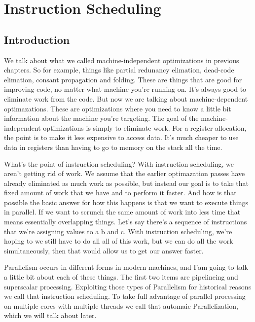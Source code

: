 \section{Instruction Scheduling}







\subsection{Introduction}
We talk about what we called
machine-independent optimizations in previous chapters. So for example, things like
partial redunancy elimation, dead-code elimation, consant propagation and 
folding. These are things that are good for improving code, no matter
what machine you're running on. It's always good to eliminate work
from the code. But now we are talking about machine-dependent optimazations.
These are optimizations where you need to know a little bit information
about the machine you're targeting. The goal of the machine-independent
optimizations is simply to eliminate work. For a register allocation, the point
is to make it less expensive to access data. It's much cheaper to use data in 
registers than having to go to memory on the stack all the time. 

What's the point of instruction scheduling? With instruction scheduling, 
we aren't getting rid of work. We assume that the earlier optimazation passes have 
already eliminated as much work as possible, but instead our goal is to take that 
fixed amount of work that we have and to perform it faster. And how is that possible
the basic answer for how this happens is that we want to execute things in parallel.
If we want to scrunch the same amount of work into less time that means essentially
overlapping things. Let's say there's a sequence of instructions that we're assigning 
values to a b and c. With instruction scheduling, we're hoping to we still have to do all
all of this work, but we can do all the work simultaneously, then that would allow 
us to get our answer faster. 

Parallelism occurs in different forms in modern machines, and I'am going to talk a little
bit about each of these things. The first two items are pipelineing and superscalar 
processing. Exploiting those types of Parallelism for historical reasons we call that 
instruction scheduling. To take full advantage of parallel processing on multiple cores
with multiple threads we call that automaic Parallelization, which we will talk about
later. 

